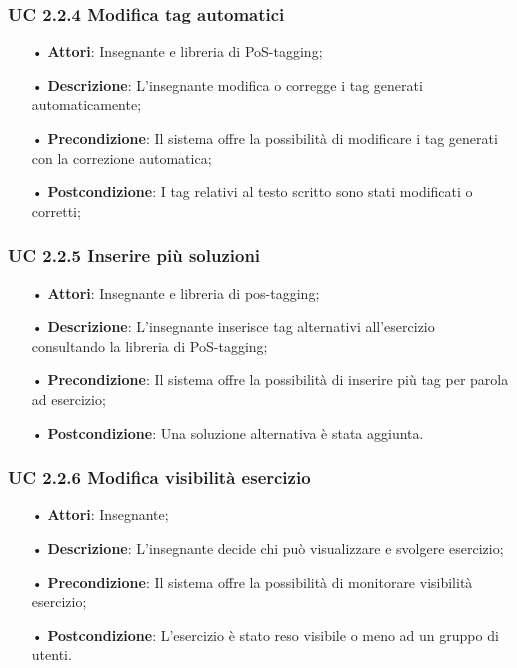 \subsubsection{UC 2.2.4	Modifica tag automatici}
\begin{itemize}
	\item[•] \textbf{Attori}: Insegnante e libreria di PoS-tagging;
	\item[•] \textbf{Descrizione}: L’insegnante modifica o corregge i tag generati automaticamente;
	\item[•] \textbf{Precondizione}: Il sistema offre la possibilità di modificare i tag generati con la correzione automatica;
	\item[•] \textbf{Postcondizione}: I tag relativi al testo scritto sono stati modificati o corretti;
\end{itemize}

\subsubsection{UC 2.2.5	Inserire più soluzioni}
\begin{itemize}
	\item[•] \textbf{Attori}: Insegnante e libreria di pos-tagging;
	\item[•] \textbf{Descrizione}: L'insegnante inserisce tag alternativi all’esercizio consultando la libreria di PoS-tagging;
	\item[•] \textbf{Precondizione}: Il sistema offre la possibilità di inserire più tag per parola ad esercizio;
	\item[•] \textbf{Postcondizione}: Una soluzione alternativa è stata aggiunta.
\end{itemize}

\subsubsection{UC 2.2.6	Modifica visibilità esercizio}
\begin{itemize}
	\item[•] \textbf{Attori}: Insegnante;
	\item[•] \textbf{Descrizione}: L'insegnante decide chi può visualizzare e svolgere esercizio;
	\item[•] \textbf{Precondizione}: Il sistema offre la possibilità di monitorare visibilità esercizio;
	\item[•] \textbf{Postcondizione}: L’esercizio è stato reso visibile o meno ad un gruppo di utenti.
\end{itemize}

